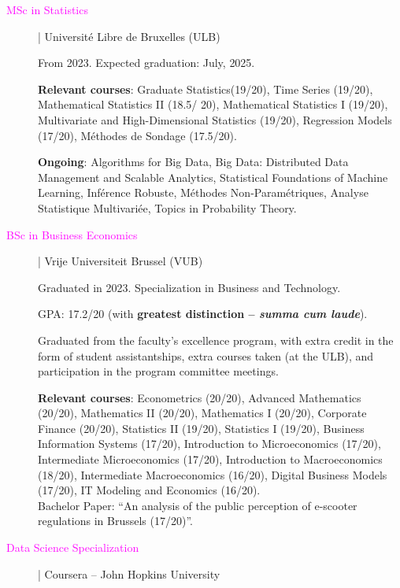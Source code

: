 \documentclass[12pt]{article}
\begin{document}
\begin{description}

\item[\textcolor{Fuchsia}{MSc in Statistics}] | Université Libre de Bruxelles (ULB)

From 2023. Expected graduation: July, 2025.

\textbf{Relevant courses}: Graduate Statistics(19/20), Time Series (19/20), Mathematical Statistics II (18.5/ 20), Mathematical Statistics I (19/20), Multivariate and High-Dimensional Statistics (19/20), Regression Models (17/20), Méthodes de Sondage (17.5/20).
  
\textbf{Ongoing}: Algorithms for Big Data, Big Data: Distributed Data Management and Scalable Analytics, Statistical Foundations of Machine Learning, Inférence Robuste, Méthodes Non-Paramétriques, Analyse Statistique Multivariée, Topics in Probability Theory.

\item[\textcolor{Fuchsia}{BSc in Business Economics}] | Vrije Universiteit Brussel (VUB)

Graduated in 2023. Specialization in Business and Technology.
  
GPA: 17.2/20 (with \textbf{greatest distinction -- \emph{summa cum laude}}).

Graduated from the faculty's excellence program, with extra credit in the form of student assistantships, extra courses taken (at the ULB), and participation in the program committee meetings.

\textbf{Relevant courses}: Econometrics (20/20), Advanced Mathematics (20/20), Mathematics II (20/20), Mathematics I (20/20), Corporate Finance (20/20), Statistics II (19/20), Statistics I (19/20), Business Information Systems (17/20), Introduction to Microeconomics (17/20), Intermediate Microeconomics (17/20), Introduc\-tion to Macroeconomics (18/20), Intermediate Macroeconomics (16/20), Digital Business Models (17/20), IT Modeling and Economics (16/20).\\

Bachelor Paper: ``An analysis of the public perception of e-scooter regulations in Brussels (17/20)''.

\item[\textcolor{Fuchsia}{Data Science Specialization}] | Coursera -- John Hopkins University
  
  

\end{description}
\end{document}
